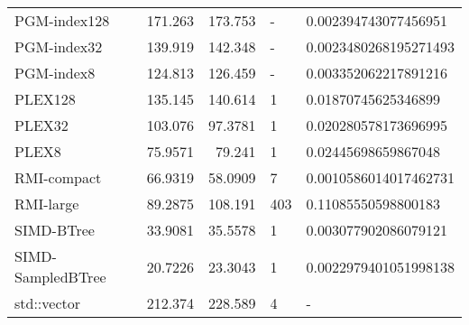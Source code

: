 \begin{tabular}{lrrll}
 PGM-index128      &               171.263  &              173.753  & -            & 0.002394743077456951  \\
 PGM-index32       &               139.919  &              142.348  & -            & 0.0023480268195271493 \\
 PGM-index8        &               124.813  &              126.459  & -            & 0.003352062217891216  \\
 PLEX128           &               135.145  &              140.614  & 1            & 0.01870745625346899   \\
 PLEX32            &               103.076  &               97.3781 & 1            & 0.020280578173696995  \\
 PLEX8             &                75.9571 &               79.241  & 1            & 0.02445698659867048   \\
 RMI-compact       &                66.9319 &               58.0909 & 7            & 0.0010586014017462731 \\
 RMI-large         &                89.2875 &              108.191  & 403          & 0.11085550598800183   \\
 SIMD-BTree        &                33.9081 &               35.5578 & 1            & 0.003077902086079121  \\
 SIMD-SampledBTree &                20.7226 &               23.3043 & 1            & 0.0022979401051998138 \\
 std::vector       &               212.374  &              228.589  & 4            & -                     \\
\hline
\end{tabular}